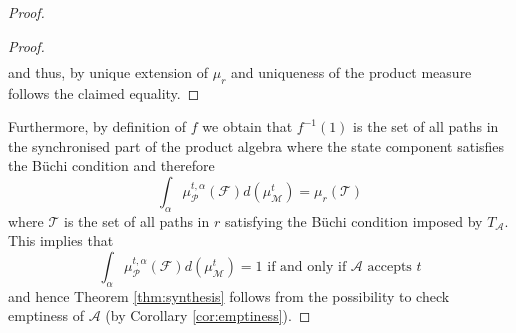 \begin{proof}
\begin{proof}
\begin{align*}
  \end{align*}
  and thus, by unique extension of $\mu_{r}$ and uniqueness of the product
  measure \cite[Theorem 5.6, Theorem 22.2]{Bauer} follows the claimed equality.
\end{proof}
Furthermore, by definition of $f$ we obtain that $f^{-1}(1)$ is the set of all
paths in the synchronised part of the product algebra where the state component
satisfies the Büchi condition and therefore
\begin{equation*}
  \int_{\alpha}\mu_{\mathcal{P}}^{t,\alpha}(\mathcal{F})
  d(\mu_{\mathcal{M}}^{t}) = \mu_{r}(\mathcal{T})
\end{equation*}
where $\mathcal{T}$ is the set of all paths in $r$ satisfying the Büchi
condition imposed by $T_{\mathcal{A}}$. This implies that
\begin{equation*}
  \int_{\alpha}\mu_{\mathcal{P}}^{t,\alpha}(\mathcal{F})
  d(\mu_{\mathcal{M}}^{t}) = 1\text{ if and only if }\mathcal{A}
  \text{ accepts } t
\end{equation*}
and hence Theorem \ref{thm:synthesis} follows from the possibility to check
emptiness of $\mathcal{A}$ (by Corollary \ref{cor:emptiness}).
\end{proof}
